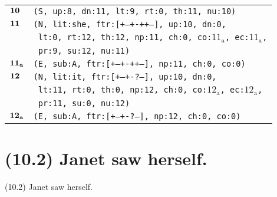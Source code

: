 \documentclass{article}
\begin{document}
\begin{minipage}{\textwidth}
{\begin{tabular}{|r|l|}
    ${\textbf{\textrm{10}}_{\phantom{z}}}$ & \texttt{\texttt{(S,~up:8,~dn:11,~lt:9,~rt:0,~th:11,~nu:10)}} \\
    ${\textbf{\textrm{11}}_{\phantom{z}}}$ & \texttt{\texttt{(N,~lit:she,~ftr:[+--+-++--],~up:10,~dn:0,}} \\
    & \texttt{\texttt{~lt:0,~rt:12,~th:12,~np:11,~ch:0,~co:${\textrm{11}_{\textrm{a}}}$,~ec:${\textrm{11}_{\textrm{a}}}$,}} \\
    & \texttt{\texttt{~pr:9,~su:12,~nu:11)}} \\
    ${\textbf{\textrm{11}}_{\textbf{\textrm{a}}}}$ & \texttt{\texttt{(E,~sub:A,~ftr:[+--+-++--],~np:11,~ch:0,~co:0)}} \\
    ${\textbf{\textrm{12}}_{\phantom{z}}}$ & \texttt{\texttt{(N,~lit:it,~ftr:[+--+-?---],~up:10,~dn:0,}} \\
    & \texttt{\texttt{~lt:11,~rt:0,~th:0,~np:12,~ch:0,~co:${\textrm{12}_{\textrm{a}}}$,~ec:${\textrm{12}_{\textrm{a}}}$,}} \\
    & \texttt{\texttt{~pr:11,~su:0,~nu:12)}} \\
    ${\textbf{\textrm{12}}_{\textbf{\textrm{a}}}}$ & \texttt{\texttt{(E,~sub:A,~ftr:[+--+-?---],~np:12,~ch:0,~co:0)}} \\
    \hline
  \end{tabular}
  }
\end{minipage}
\bigbreak

\clearpage

%
%

\section*{(10.2) Janet saw herself.}

\bigbreak
\begin{enumerate*}
\item[(10.2)] Janet saw herself.
\end{enumerate*}
\bigbreak
\end{document}

